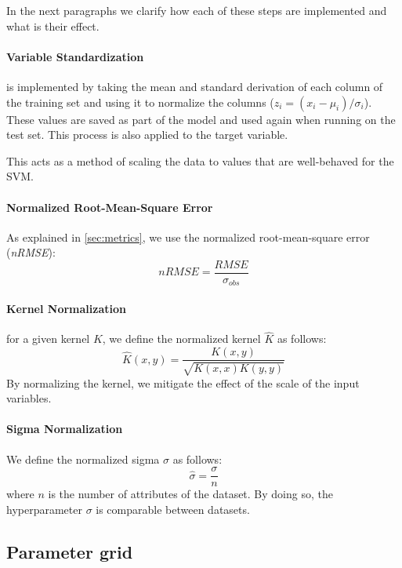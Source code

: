 In the next paragraphs we clarify how each of these steps are implemented and
what is their effect.

\paragraph{Variable Standardization} is implemented by taking the mean and
standard derivation of each column of the training set and using it to normalize
the columns ($z_i = (x_i - \mu_i)/\sigma_i$). These values are saved as part of
the model and used again when running on the test set. This process is also
applied to the target variable.

This acts as a method of scaling the data to values that are well-behaved for
the SVM.

\paragraph{Normalized Root-Mean-Square Error} As explained
in \cref{sec:metrics}, we use the normalized root-mean-square error (\emph{nRMSE}):
\begin{equation}
    nRMSE = \frac{RMSE}{\sigma_{obs}}
\end{equation}

\paragraph{Kernel Normalization} for a given kernel $K$, we define the
normalized kernel $\hat{K}$ as follows:
\begin{equation}
    \hat{K}(x, y) = \frac{K(x, y)}{\sqrt{K(x, x)K(y, y)}}
\end{equation}
By normalizing the kernel, we mitigate the effect of the scale of the
input variables. %

\paragraph{Sigma Normalization} We define the normalized sigma $\hat{\sigma}$
as follows:
\begin{equation}
    \hat{\sigma} = \frac{\sigma}{n}
\end{equation}
where $n$ is the number of attributes of the dataset. By doing so, the
hyperparameter $\sigma$ is comparable between datasets.

\subsection{Parameter grid}

